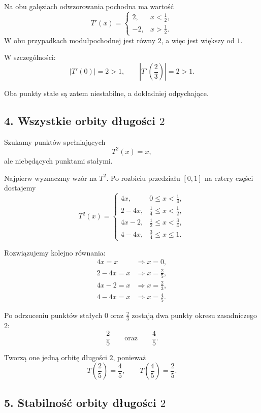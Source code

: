 \documentclass[11pt,a4paper]{article}
\newcommand{\abs}[1]{\left\lvert #1 \right\rvert}
\theoremstyle{plain}
\theoremstyle{definition}
\begin{document}
\begin{rozwiazaniebox}
Na obu ga\l \k{e}ziach odwzorowania pochodna ma warto\'s\'c
\[
    T'(x)=
    \begin{cases}
        2, & x<\tfrac{1}{2},\\
        -2, & x>\tfrac{1}{2}.
    \end{cases}
\]
W obu przypadkach modu\l pochodnej jest r\'owny \(2\), a wi\k{e}c jest wi\k{e}kszy od \(1\).

W szczeg\'olno\'sci:
\[
    \abs{T'(0)}=2>1,
    \qquad
    \abs{T'\!\left(\frac{2}{3}\right)}=2>1.
\]

Oba punkty sta\l e s\k{a} zatem niestabilne, a dok\l adniej odpychaj\k{a}ce.

\subsection*{4. Wszystkie orbity d\l ugo\'sci \(2\)}

Szukamy punkt\'ow spe\l niaj\k{a}cych
\[
    T^2(x)=x,
\]
ale nieb\k{e}d\k{a}cych punktami sta\l ymi.

Najpierw wyznaczmy wz\'or na \(T^2\). Po rozbiciu przedzia\l u \([0,1]\) na cztery cz\k{e}\'sci dostajemy
\[
T^2(x)=
\begin{cases}
4x, & 0 \le x < \tfrac{1}{4},\\[0.3em]
2-4x, & \tfrac{1}{4} \le x < \tfrac{1}{2},\\[0.3em]
4x-2, & \tfrac{1}{2} \le x < \tfrac{3}{4},\\[0.3em]
4-4x, & \tfrac{3}{4} \le x \le 1.
\end{cases}
\]

Rozwi\k{a}zujemy kolejno r\'ownania:
\[
\begin{aligned}
4x=x &\Longrightarrow x=0,\\
2-4x=x &\Longrightarrow x=\frac{2}{5},\\
4x-2=x &\Longrightarrow x=\frac{2}{3},\\
4-4x=x &\Longrightarrow x=\frac{4}{5}.
\end{aligned}
\]

Po odrzuceniu punkt\'ow sta\l ych \(0\) oraz \(\tfrac{2}{3}\) zostaj\k{a} dwa punkty okresu zasadniczego \(2\):
\[
    \frac{2}{5}
    \qquad \text{oraz} \qquad
    \frac{4}{5}.
\]

Tworz\k{a} one jedn\k{a} orbit\k{e} d\l ugo\'sci \(2\), poniewa\.z
\[
    T\!\left(\frac{2}{5}\right)=\frac{4}{5},
    \qquad
    T\!\left(\frac{4}{5}\right)=\frac{2}{5}.
\]

\subsection*{5. Stabilno\'s\'c orbity d\l ugo\'sci \(2\)}


\end{rozwiazaniebox}
\end{document}
